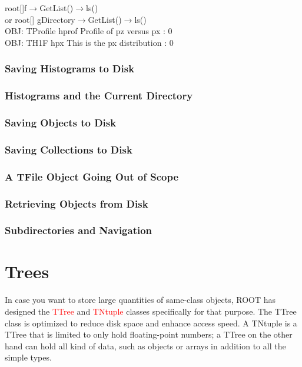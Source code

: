 \documentclass[12pt,a4paper]{article}
\begin{document}
root[]f$\rightarrow$GetList()$\rightarrow$ls() \\
or root[] gDirectory$\rightarrow$GetList()$\rightarrow$ls() \\
OBJ: TProfile hprof Profile of pz versus px : 0 \\
OBJ: TH1F hpx This is the px distribution : 0 \\

\subsubsection{Saving Histograms to Disk}


\subsubsection{Histograms and the Current Directory}


\subsubsection{Saving Objects to Disk}


\subsubsection{Saving Collections to Disk}


\subsubsection{A TFile Object Going Out of Scope}



\subsubsection{Retrieving Objects from Disk}


\subsubsection{Subdirectories and Navigation}



\section{Trees}
In case you want to store large quantities of same-class objects, ROOT has designed the \textcolor{red}{TTree} and \textcolor{red}{TNtuple} classes specifically for that purpose. The TTree class is optimized to reduce disk space and enhance access speed. A TNtuple is a TTree that is limited to only hold floating-point numbers; a TTree on the other hand can hold all kind of data, such as objects or arrays in addition to all the simple types. 
\end{document}

